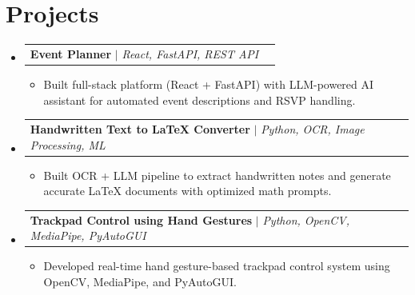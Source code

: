 \documentclass[letterpaper,11pt]{article}
\makeatletter
\newcommand{\resumeItem}[1]{
  \item\small{
    {#1 \vspace{-1pt}}
  }
}
\newcommand{\resumeProjectHeading}[2]{
    \item
    \begin{tabular*}{0.97\textwidth}{l@{\extracolsep{\fill}}r}
      \small#1 & #2 \\
    \end{tabular*}\vspace{-2pt}
}
\newcommand{\resumeSubHeadingListStart}{\begin{itemize}[leftmargin=0.15in, label={}]}
\newcommand{\resumeSubHeadingListEnd}{\end{itemize}\vspace{-5pt}}
\newcommand{\resumeItemListStart}{\begin{itemize}\vspace{-3pt}}
\newcommand{\resumeItemListEnd}{\end{itemize}\vspace{-2pt}}
\makeatother
\begin{document}
\section{Projects}
    \resumeSubHeadingListStart
      \resumeProjectHeading
          {\textbf{Event Planner} $|$ \emph{React, FastAPI, REST API}}{}
          \resumeItemListStart
            \resumeItem{Built full-stack platform (React + FastAPI) with LLM-powered AI assistant for automated event descriptions and RSVP handling.}
          \resumeItemListEnd
      \resumeProjectHeading
          {\textbf{Handwritten Text to LaTeX Converter} $|$ \emph{Python, OCR, Image Processing, ML}}{}
          \resumeItemListStart
            \resumeItem{Built OCR + LLM pipeline to extract handwritten notes and generate accurate LaTeX documents with optimized math prompts.}
          \resumeItemListEnd
      \resumeProjectHeading
          {\textbf{Trackpad Control using Hand Gestures} $|$ \emph{Python, OpenCV, MediaPipe, PyAutoGUI}}{}
          \resumeItemListStart
            \resumeItem{Developed real-time hand gesture-based trackpad control system using OpenCV, MediaPipe, and PyAutoGUI.}
          \resumeItemListEnd
    \resumeSubHeadingListEnd
\end{document}

